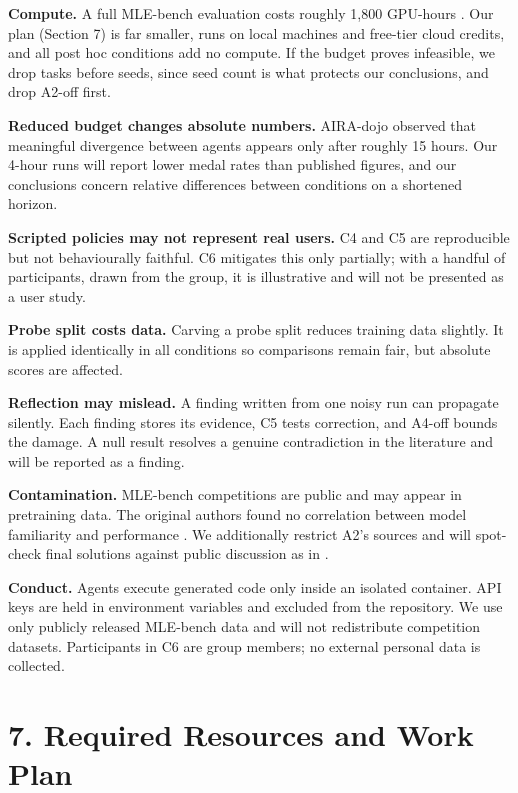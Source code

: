 \documentclass[11pt]{article}
\begin{document}
\textbf{Compute.} A full MLE-bench evaluation costs roughly 1{,}800 GPU-hours
\cite{mlebench}. Our plan (Section 7) is far smaller, runs on local machines and
free-tier cloud credits, and all post hoc conditions add no compute. If the budget proves infeasible, we drop tasks before seeds, since seed
count is what protects our conclusions, and drop A2-off first.

\textbf{Reduced budget changes absolute numbers.} AIRA-dojo \cite{aira} observed that
meaningful divergence between agents appears only after roughly 15 hours. Our 4-hour
runs will report lower medal rates than published figures, and our conclusions
concern relative differences between conditions on a shortened horizon.

\textbf{Scripted policies may not represent real users.} C4 and C5 are reproducible
but not behaviourally faithful. C6 mitigates this only partially; with a handful of
participants, drawn from the group, it is illustrative and will not be presented as a
user study.

\textbf{Probe split costs data.} Carving a probe split reduces training data slightly.
It is applied identically in all conditions so comparisons remain fair, but absolute
scores are affected.

\textbf{Reflection may mislead.} A finding written from one noisy run can propagate
silently. Each finding stores its evidence, C5 tests correction, and A4-off bounds
the damage. A null result resolves a genuine contradiction in the literature and will
be reported as a finding.

\textbf{Contamination.} MLE-bench competitions are public and may appear in
pretraining data. The original authors found no correlation between model
familiarity and performance \cite{mlebench}. We additionally restrict A2's sources
and will spot-check final solutions against public discussion as in \cite{mlestar}.

\textbf{Conduct.} Agents execute generated code only inside an isolated container.
API keys are held in environment variables and excluded from the repository. We use
only publicly released MLE-bench data and will not redistribute competition datasets.
Participants in C6 are group members; no external personal data is collected.

\section*{7. Required Resources and Work Plan}
\end{document}
